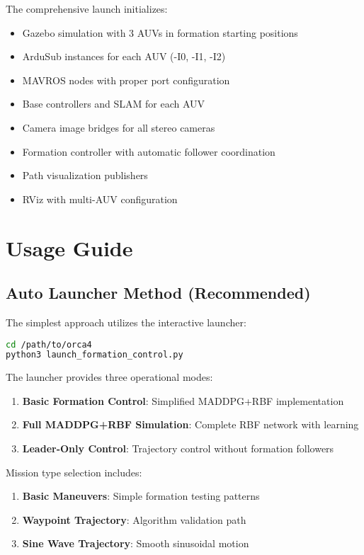 \documentclass[11pt,a4paper]{article}
\begin{document}
The comprehensive launch initializes:
\begin{itemize}
    \item Gazebo simulation with 3 AUVs in formation starting positions
    \item ArduSub instances for each AUV (-I0, -I1, -I2)
    \item MAVROS nodes with proper port configuration
    \item Base controllers and SLAM for each AUV
    \item Camera image bridges for all stereo cameras
    \item Formation controller with automatic follower coordination
    \item Path visualization publishers
    \item RViz with multi-AUV configuration
\end{itemize}

\section{Usage Guide}

\subsection{Auto Launcher Method (Recommended)}

The simplest approach utilizes the interactive launcher:

\begin{lstlisting}[language=bash, caption=Auto Launcher Execution]
cd /path/to/orca4
python3 launch_formation_control.py
\end{lstlisting}

The launcher provides three operational modes:
\begin{enumerate}
    \item \textbf{Basic Formation Control}: Simplified MADDPG+RBF implementation
    \item \textbf{Full MADDPG+RBF Simulation}: Complete RBF network with learning
    \item \textbf{Leader-Only Control}: Trajectory control without formation followers
\end{enumerate}

Mission type selection includes:
\begin{enumerate}
    \item \textbf{Basic Maneuvers}: Simple formation testing patterns
    \item \textbf{Waypoint Trajectory}: Algorithm validation path
    \item \textbf{Sine Wave Trajectory}: Smooth sinusoidal motion
\end{enumerate}
\end{document}
